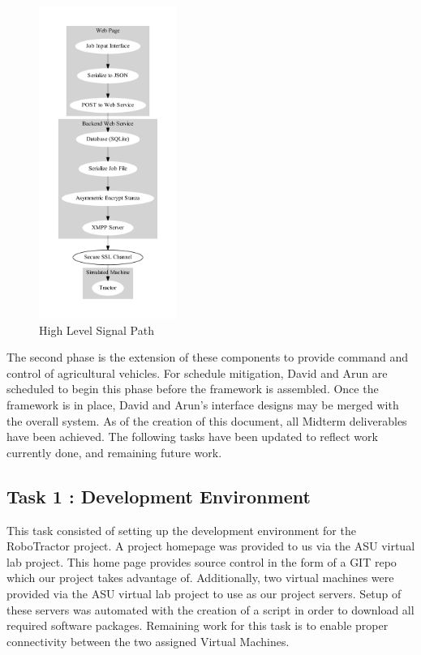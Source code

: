 \documentclass[conference,12pt]{IEEEtran}
\begin{document}
\begin{figure}
\centering
\includegraphics[width=0.4\textwidth]{signalpath.pdf}
\caption{High Level Signal Path}
\label{fig:signalpath}
\end{figure}


The second phase is the extension of these components to provide command and
control of agricultural vehicles. For schedule mitigation, David and Arun are
scheduled to begin this phase before the framework is assembled. Once the
framework is in place, David and Arun's interface designs may be merged with the
overall system. As of the creation of this document, all Midterm deliverables have been achieved.
The following tasks have been updated to reflect work currently done, and remaining future work.

\subsection{Task 1 : Development Environment}
This task consisted of setting up the development environment for the RoboTractor project. 
A project homepage was provided to us via the ASU virtual lab project. This home page provides
source control in the form of a GIT repo which our project takes advantage of. Additionally, two
virtual machines were provided via the ASU virtual lab project to use as our project servers. Setup of
these servers was automated with the creation of a script in order to download all required software packages.
Remaining work for this task is to enable proper connectivity between the two
assigned Virtual Machines. 
\end{document}
